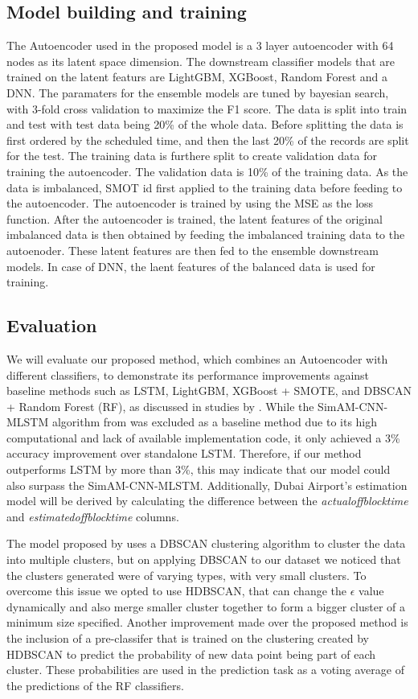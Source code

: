 \documentclass[twoside,11pt]{article}
\begin{document}
\subsection{Model building and training}
The Autoencoder used in the proposed model is a 3 layer autoencoder with 64 nodes as its latent space dimension. The downstream classifier models that are trained on the latent featurs are LightGBM, XGBoost, Random Forest and a DNN. The paramaters for the ensemble models are tuned by bayesian search, with 3-fold cross validation to maximize the F1 score. The data is split into train and test with test data being 20\% of the whole data. Before splitting the data is first ordered by the scheduled time, and then the last 20\% of the records are split for the test. The training data is furthere split to create validation data for training the autoencoder. The validation data is 10\% of the training data.
As the data is imbalanced, SMOT id first applied to the training data before feeding to the autoencoder. The autoencoder is trained by using the MSE as the loss function. After the autoencoder is trained, the latent features of the original imbalanced data is then obtained by feeding the imbalanced training data to the autoenoder. These latent features are then fed to the ensemble downstream models. In case of DNN, the laent features of the balanced data is used for training.

\subsection{Evaluation}
We will evaluate our proposed method, which combines an Autoencoder with different classifiers, to demonstrate its performance improvements against baseline methods such as LSTM, LightGBM, XGBoost + SMOTE, and DBSCAN + Random Forest (RF), as discussed in studies by \cite{liu2022flight, tao2021flight, hatipoglu2024predictive, Dai2024}. While the SimAM-CNN-MLSTM algorithm from \cite{qu2023flight} was excluded as a baseline method due to its high computational and lack of available implementation code, it only achieved a 3\% accuracy improvement over standalone LSTM. Therefore, if our method outperforms LSTM by more than 3\%, this may indicate that our model could also surpass the SimAM-CNN-MLSTM. Additionally, Dubai Airport’s estimation model will be derived by calculating the difference between the \emph{actualoffblocktime} and \emph{estimatedoffblocktime} columns.

The model proposed by \cite{Dai2024} uses a DBSCAN clustering algorithm to cluster the data into multiple clusters, but on applying DBSCAN to our dataset we noticed that the clusters generated were of varying types, with very small clusters. To overcome this issue we opted to use HDBSCAN, that can change the \(\epsilon\) value dynamically and also merge smaller cluster together to form a bigger cluster of a minimum size specified. Another improvement made over the proposed method is the inclusion of a pre-classifer that is trained on the clustering created by HDBSCAN to predict the probability of new data point being part of each cluster. These probabilities are used in the prediction task as a voting average of the predictions of the RF classifiers. 
\end{document}
